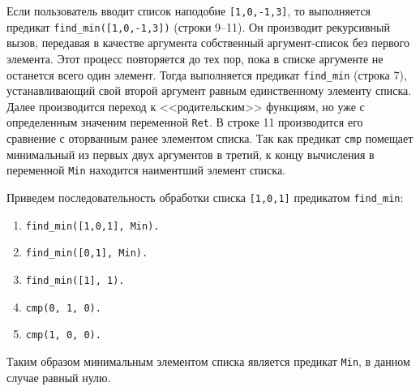 Если пользователь вводит список наподобие \texttt{[1,0,-1,3]},
то выполняется предикат \texttt{find\_min([1,0,-1,3])} (строки 9--11). 
Он производит рекурсивный вызов, передавая в качестве аргумента
собственный аргумент-список без первого элемента. 
Этот процесс повторяется до тех пор, 
пока в списке аргументе не останется всего один элемент.
Тогда выполняется предикат \texttt{find\_min} (строка 7),
устанавливающий свой второй аргумент равным единственному элементу списка.
Далее производится переход к <<родительским>> функциям, 
но уже с определенным значеним переменной \texttt{Ret}.
В строке 11 производится его сравнение с оторванным ранее элементом списка.
Так как предикат \texttt{cmp} помещает минимальный из первых двух аргументов
в третий, к концу вычисления в переменной \texttt{Min} находится наиментший элемент списка.

Приведем последовательность обработки списка \texttt{[1,0,1]} предикатом \texttt{find\_min}:
\begin{enumerate}
\item \texttt{find\_min([1,0,1], Min).}
\item \texttt{find\_min([0,1], Min).}
\item \texttt{find\_min([1], 1).}
\item \texttt{cmp(0, 1, 0).}
\item \texttt{cmp(1, 0, 0).}
\end{enumerate}

Таким образом минимальным элементом списка является предикат \texttt{Min},
в данном случае равный нулю.
